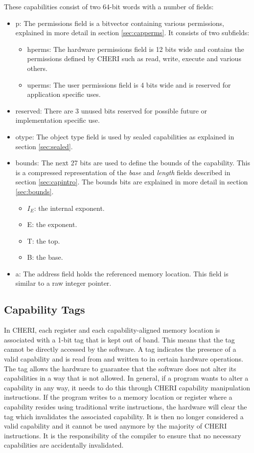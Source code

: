 These capabilities consist of two 64-bit words with a number of fields:

\begin{itemize}
    \item p: The permissions field is a bitvector containing various permissions, explained in more detail in section \ref{sec:capperms}. It consists of two subfields:
        \begin{itemize}
            \item hperms: The hardware permissions field is 12 bits wide and contains the permissions defined by CHERI such as read, write, execute and various others.
            \item uperms: The user permissions field is 4 bits wide and is reserved for application specific uses.
        \end{itemize}
    \item reserved: There are 3 unused bits reserved for possible future or implementation specific use.
    \item otype: The object type field is used by sealed capabilities as explained in section \ref{sec:sealed}.
    \item bounds: The next 27 bits are used to define the bounds of the capability. This is a compressed representation of the \textit{base} and \textit{length} fields described in section \ref{sec:capintro}. The bounds bits are explained in more detail in section \ref{sec:bounds}.
        \begin{itemize}
            \item $I_E$: the internal exponent.
            \item E: the exponent.
            \item T: the top.
            \item B: the base.
        \end{itemize}
    \item a: The address field holds the referenced memory location. This field is similar to a raw integer pointer.
\end{itemize}

\subsection{Capability Tags}
In CHERI, each register and each capability-aligned memory location is associated with a 1-bit tag that is kept out of band. This means that the tag cannot be directly accessed by the software. A tag indicates the presence of a valid capability and is read from and written to in certain hardware operations. The tag allows the hardware to guarantee that the software does not alter its capabilities in a way that is not allowed. In general, if a program wants to alter a capability in any way, it needs to do this through CHERI capability manipulation instructions. If the program writes to a memory location or register where a capability resides using traditional write instructions, the hardware will clear the tag which invalidates the associated capability. It is then no longer considered a valid capability and it cannot be used anymore by the majority of CHERI instructions. It is the responsibility of the compiler to ensure that no necessary capabilities are accidentally invalidated. 

